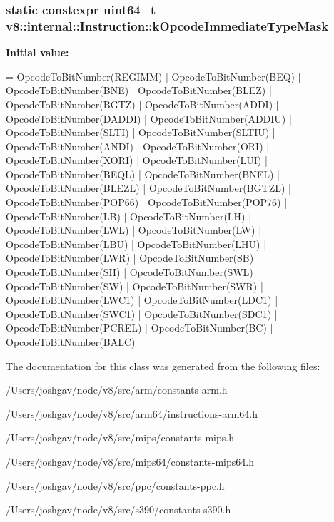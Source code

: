\subsubsection[{\texorpdfstring{k\+Opcode\+Immediate\+Type\+Mask}{kOpcodeImmediateTypeMask}}]{\setlength{\rightskip}{0pt plus 5cm}static constexpr uint64\+\_\+t v8\+::internal\+::\+Instruction\+::k\+Opcode\+Immediate\+Type\+Mask\hspace{0.3cm}{\ttfamily [static]}}\hypertarget{classv8_1_1internal_1_1_instruction_a856dbcdf964143c5fb3928b3981f224c}{}\label{classv8_1_1internal_1_1_instruction_a856dbcdf964143c5fb3928b3981f224c}
{\bfseries Initial value\+:}
\begin{DoxyCode}
=
      OpcodeToBitNumber(REGIMM) | OpcodeToBitNumber(BEQ) |
      OpcodeToBitNumber(BNE) | OpcodeToBitNumber(BLEZ) |
      OpcodeToBitNumber(BGTZ) | OpcodeToBitNumber(ADDI) |
      OpcodeToBitNumber(DADDI) | OpcodeToBitNumber(ADDIU) |
      OpcodeToBitNumber(SLTI) | OpcodeToBitNumber(SLTIU) |
      OpcodeToBitNumber(ANDI) | OpcodeToBitNumber(ORI) |
      OpcodeToBitNumber(XORI) | OpcodeToBitNumber(LUI) |
      OpcodeToBitNumber(BEQL) | OpcodeToBitNumber(BNEL) |
      OpcodeToBitNumber(BLEZL) | OpcodeToBitNumber(BGTZL) |
      OpcodeToBitNumber(POP66) | OpcodeToBitNumber(POP76) |
      OpcodeToBitNumber(LB) | OpcodeToBitNumber(LH) | OpcodeToBitNumber(LWL) |
      OpcodeToBitNumber(LW) | OpcodeToBitNumber(LBU) | OpcodeToBitNumber(LHU) |
      OpcodeToBitNumber(LWR) | OpcodeToBitNumber(SB) | OpcodeToBitNumber(SH) |
      OpcodeToBitNumber(SWL) | OpcodeToBitNumber(SW) | OpcodeToBitNumber(SWR) |
      OpcodeToBitNumber(LWC1) | OpcodeToBitNumber(LDC1) |
      OpcodeToBitNumber(SWC1) | OpcodeToBitNumber(SDC1) |
      OpcodeToBitNumber(PCREL) | OpcodeToBitNumber(BC) |
      OpcodeToBitNumber(BALC)
\end{DoxyCode}


The documentation for this class was generated from the following files\+:\begin{DoxyCompactItemize}
\item 
/\+Users/joshgav/node/v8/src/arm/constants-\/arm.\+h\item 
/\+Users/joshgav/node/v8/src/arm64/instructions-\/arm64.\+h\item 
/\+Users/joshgav/node/v8/src/mips/constants-\/mips.\+h\item 
/\+Users/joshgav/node/v8/src/mips64/constants-\/mips64.\+h\item 
/\+Users/joshgav/node/v8/src/ppc/constants-\/ppc.\+h\item 
/\+Users/joshgav/node/v8/src/s390/constants-\/s390.\+h\end{DoxyCompactItemize}
